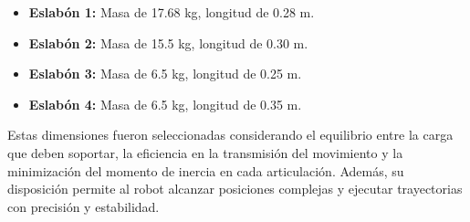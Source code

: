 \begin{itemize}

	\item \textbf{Eslabón 1:} Masa de 17.68 kg, longitud de 0.28 m.
	\item \textbf{Eslabón 2:} Masa de 15.5 kg, longitud de 0.30 m.
	\item \textbf{Eslabón 3:} Masa de 6.5 kg, longitud de 0.25 m.
	\item \textbf{Eslabón 4:} Masa de 6.5 kg, longitud de 0.35 m.
\end{itemize}

Estas dimensiones fueron seleccionadas considerando el equilibrio entre la carga que deben soportar, la eficiencia en la transmisión del movimiento y la minimización del momento de inercia en cada articulación. Además, su disposición permite al robot alcanzar posiciones complejas y ejecutar trayectorias con precisión y estabilidad.
